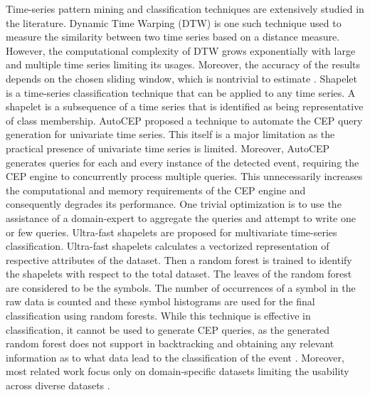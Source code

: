 \documentclass[conference]{IEEEtran}  %
\begin{document}
Time-series pattern mining and classification techniques are extensively studied in the literature. Dynamic Time Warping (DTW) \cite{IEEEexample:DTW} is one such technique used to measure the similarity between two time series based on a distance measure. However, the computational complexity of DTW grows exponentially with large and multiple time series limiting its usages. Moreover, the accuracy of the results depends on the chosen sliding window, which is nontrivial to estimate \cite{IEEEexample:autoCEP}. Shapelet \cite{IEEEexample:TimeSeriesShapelets} is a time-series classification technique that can be applied to any time series. A shapelet is a subsequence of a time series that is identified as being representative of class membership. AutoCEP \cite{IEEEexample:autoCEP} proposed a technique to automate the CEP query generation for univariate time series. This itself is a major limitation as the practical presence of univariate time series is limited. Moreover, AutoCEP generates queries for each and every instance of the detected event, requiring the CEP engine to concurrently process multiple queries. This unnecessarily increases the computational and memory requirements of the CEP engine and consequently degrades its performance. One trivial optimization is to use the assistance of a domain-expert to aggregate the queries and attempt to write one or few queries. Ultra-fast shapelets \cite{IEEEexample:UltraFast} are proposed for multivariate time-series classification. Ultra-fast shapelets calculates a vectorized representation of respective attributes of the dataset. Then a random forest is trained to identify the shapelets with respect to the total dataset. The leaves of the random forest are considered to be the symbols. The number of occurrences of a symbol in the raw data is counted and these symbol histograms are used for the final classification using random forests. While this technique is effective in classification, it cannot be used to generate CEP queries, as the generated random forest does not support in backtracking and obtaining any relevant information as to what data lead to the classification of the event \cite{IEEEexample:UltraFast}. Moreover, most related work focus only on domain-specific datasets limiting the usability across diverse datasets \cite{IEEEexample:UserOriented,IEEEexample:WebBased}.
\end{document}
